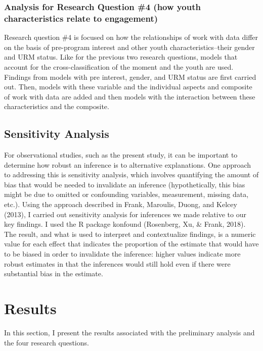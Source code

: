 \documentclass[]{msu-thesis}
\theoremstyle{definition}
\theoremstyle{definition}
\theoremstyle{definition}
\theoremstyle{remark}
\begin{document}
\subsection{Analysis for Research Question \#4 (how youth
characteristics relate to
engagement)}\label{analysis-for-research-question-4-how-youth-characteristics-relate-to-engagement}

Research question \#4 is focused on how the relationships of work with
data differ on the basis of pre-program interest and other youth
characteristics--their gender and URM status. Like for the previous two
research questions, models that account for the cross-classification of
the moment and the youth are used. Findings from models with pre
interest, gender, and URM status are first carried out. Then, models
with these variable and the individual aspects and composite of work
with data are added and then models with the interaction between these
characteristics and the composite.

\section{Sensitivity Analysis}\label{sensitivity-analysis}

For observational studies, such as the present study, it can be
important to determine how robust an inference is to alternative
explanations. One approach to addressing this is sensitivity analysis,
which involves quantifying the amount of bias that would be needed to
invalidate an inference (hypothetically, this bias might be due to
omitted or confounding variables, measurement, missing data, etc.).
Using the approach described in Frank, Maroulis, Duong, and Kelcey
(2013), I carried out sensitivity analysis for inferences we made
relative to our key findings. I used the R package konfound (Rosenberg,
Xu, \& Frank, 2018). The result, and what is used to interpret and
contextualize findings, is a numeric value for each effect that
indicates the proportion of the estimate that would have to be biased in
order to invalidate the inference: higher values indicate more robust
estimates in that the inferences would still hold even if there were
substantial bias in the estimate.

\chapter{Results}\label{results}

In this section, I present the results associated with the preliminary
analysis and the four research questions.
\end{document}
